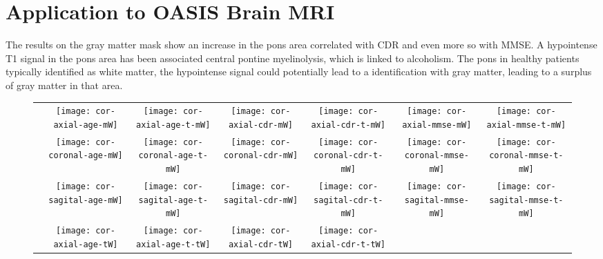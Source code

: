 \documentclass{llncs}
\begin{document}
{\section{Application to OASIS Brain MRI}

The results on the gray matter mask show an increase in the pons area
correlated with CDR and even more so with MMSE.  A hypointense T1 signal in the
pons area has been associated central pontine myelinolysis, which is linked to
alcoholism. The pons in healthy patients typically identified as white matter,
the hypointense signal could potentially lead to a identification with gray
matter, leading to a surplus of gray matter in that area.

\begingroup
\renewcommand{\arraystretch}{0}
\setlength{\tabcolsep}{0pt}
\begin{figure}[bth]
\centering
\begin{tabular}{l|cc|cc|cc} 
\parbox[t]{4mm}{}&
\texttt{[image: cor-axial-age-mW]} &
\texttt{[image: cor-axial-age-t-mW]} &
\texttt{[image: cor-axial-cdr-mW]} &
\texttt{[image: cor-axial-cdr-t-mW]} &
\texttt{[image: cor-axial-mmse-mW]} &
\texttt{[image: cor-axial-mmse-t-mW]} \\ 
%
        &
\texttt{[image: cor-coronal-age-mW]} &
\texttt{[image: cor-coronal-age-t-mW]} &
\texttt{[image: cor-coronal-cdr-mW]} &
\texttt{[image: cor-coronal-cdr-t-mW]} &
\texttt{[image: cor-coronal-mmse-mW]} &
\texttt{[image: cor-coronal-mmse-t-mW]} \\ 
%
        &
\texttt{[image: cor-sagital-age-mW]} &
\texttt{[image: cor-sagital-age-t-mW]} &
\texttt{[image: cor-sagital-cdr-mW]} &
\texttt{[image: cor-sagital-cdr-t-mW]} &
\texttt{[image: cor-sagital-mmse-mW]} &
\texttt{[image: cor-sagital-mmse-t-mW]} \\ \hline \hline
%
\parbox[t]{2mm}{}&
\texttt{[image: cor-axial-age-tW]} &
\texttt{[image: cor-axial-age-t-tW]} &
\texttt{[image: cor-axial-cdr-tW]} &
\texttt{[image: cor-axial-cdr-t-tW]} &

\end{tabular}
\end{figure}}
\end{document}
